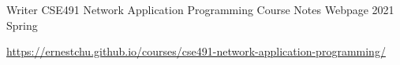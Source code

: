 \begin{cventries}
  \cventry
    {Writer} %
    {CSE491 Network Application Programming Course Notes} %
    {Webpage} %
    {2021 Spring} %
    {
      \begin{cvitems} %
        \item {\href{https://ernestchu.github.io/courses/cse491-network-application-programming/}{https://ernestchu.github.io/courses/cse491-network-application-programming/}}
      \end{cvitems}
    }

\end{cventries}
